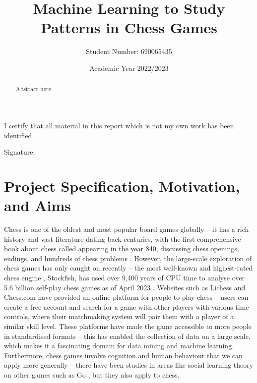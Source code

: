 \documentclass[a4paper, 11pt]{article}
\begin{document}
\title{Machine Learning to Study Patterns in Chess Games}
\author{Student Number: 690065435}
\date{Academic Year 2022/2023}

\maketitle

\newpage
\begin{abstract}
{Abstract here}.

\begin{center}
\end{center}
\end{abstract}

\vspace*{\fill}
\begin{center}

\vspace{1em}
I certify that all material in this report which is not my own work has been identified.
\end{center}
\vspace{1em}

Signature: \hrulefill

\newpage
\tableofcontents
\newpage

\section{Project Specification, Motivation, and Aims}
Chess is one of the oldest and most popular board games globally -- it has a rich history and vast literature dating back centuries, with the first comprehensive book about chess called  appearing in the year 840, discussing chess openings, endings, and hundreds of chess problems \cite{earliestChessBooks,wonning2014short}. However, the large-scale exploration of chess games has only caught on recently -- the most well-known and highest-rated chess engine \cite{computerChessRatingLists}, Stockfish, has used over 9,400 years of CPU time to analyse over 5.6 billion self-play chess games as of April 2023 \cite{stockfishTestingFramework}. Websites such as Lichess and Chess.com have provided an online platform for people to play chess -- users can create a free account and search for a game with other players with various time controls, where their matchmaking system will pair them with a player of a similar skill level. These platforms have made the game accessible to more people in standardised formats -- this has enabled the collection of data on a large scale, which makes it a fascinating domain for data mining and machine learning. Furthermore, chess games involve cognition and human behaviour that we can apply more generally -- there have been studies in areas like social learning theory on other games such as Go \cite{beheim2014strategic}, but they also apply to chess.
\end{document}
